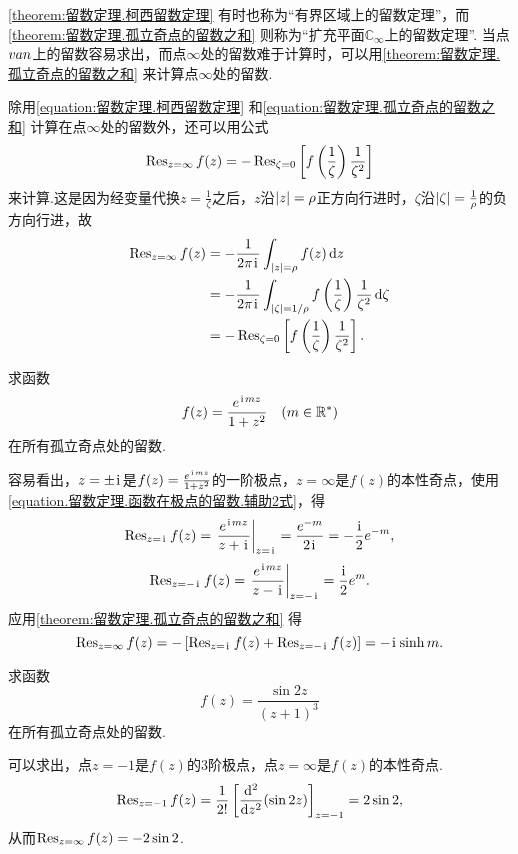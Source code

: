 \cref{theorem:留数定理.柯西留数定理} 有时也称为“有界区域上的留数定理”，而\cref{theorem:留数定理.孤立奇点的留数之和} 则称为“扩充平面\(\mathbb{C}_{\infty}\)上的留数定理”.
当点\(v{a}{n}\)上的留数容易求出，而点\(\infty\)处的留数难于计算时，可以用\cref{theorem:留数定理.孤立奇点的留数之和} 来计算点\(\infty\)处的留数.

除用\cref{equation:留数定理.柯西留数定理} 和\cref{equation:留数定理.孤立奇点的留数之和} 计算在点\(\infty\)处的留数外，还可以用公式\begin{equation}
\operatorname{Res}_{z=\infty} f(z)
= -\operatorname{Res}_{\zeta=0} \left[ f\left(\frac{1}{\zeta}\right) \frac{1}{\zeta^2} \right]
\end{equation}来计算.这是因为经变量代换\(z = \frac{1}{\zeta}\)之后，\(z\)沿\(\abs{z}=\rho\)正方向行进时，\(\zeta\)沿\(\abs{\zeta}=\frac{1}{\rho}\)的负方向行进，故\begin{align*}
\operatorname{Res}_{z=\infty} f(z)
&= -\frac{1}{2\pi\kern1pt\mathrm{i}\kern1pt} \int_{\abs{z}=\rho} f(z) \dd{z} \\
&= -\frac{1}{2\pi\kern1pt\mathrm{i}\kern1pt} \int_{\abs{\zeta}=1/\rho} f\left(\frac{1}{\zeta}\right) \frac{1}{\zeta^2} \dd{\zeta} \\
&= -\operatorname{Res}_{\zeta=0} \left[ f\left(\frac{1}{\zeta}\right) \frac{1}{\zeta^2} \right].
\end{align*}

\begin{example}
求函数\[
f(z) = \frac{e^{\kern1pt\mathrm{i}\kern1pt mz}}{1+z^2} \quad(m\in\mathbb{R}^*)
\]在所有孤立奇点处的留数.
\begin{solution}
容易看出，\(z=\pm\kern1pt\mathrm{i}\kern1pt\)是\(f(z) = \frac{e^{\kern1pt\mathrm{i}\kern1pt mz}}{1+z^2}\)的一阶极点，\(z=\infty\)是\(f(z)\)的本性奇点，使用\cref{equation.留数定理.函数在极点的留数.辅助2式}，得\[
\Res_{z=\iu} f(z)
= \eval{\frac{e^{\iu mz}}{z+\iu}}_{z=\iu}
= \frac{e^{-m}}{2\iu}
= -\frac{\iu}{2} e^{-m},
\]\[
\Res_{z=-\iu} f(z)
= \eval{\frac{e^{\iu mz}}{z-\iu}}_{z=-\iu}
= \frac{\iu}{2} e^m.
\]
应用\cref{theorem:留数定理.孤立奇点的留数之和} 得\[
\operatorname{Res}_{z=\infty} f(z)
= -\left[ \operatorname{Res}_{z=\kern1pt\mathrm{i}\kern1pt} f(z) + \operatorname{Res}_{z=-\kern1pt\mathrm{i}\kern1pt} f(z) \right]
= -\kern1pt\mathrm{i}\kern1pt \sinh m.
\]
\end{solution}
\end{example}

\begin{example}
求函数\[
f(z) = \frac{\sin 2z}{(z+1)^3}
\]在所有孤立奇点处的留数.
\begin{solution}
可以求出，点\(z=-1\)是\(f(z)\)的3阶极点，点\(z=\infty\)是\(f(z)\)的本性奇点.\[
\operatorname{Res}_{z=-1} f(z)
= \frac{1}{2!} \left[ \dv[2]{z}(\sin 2z) \right]_{z=-1}
= 2 \sin 2,
\]从而\(\operatorname{Res}_{z=\infty} f(z) = -2 \sin 2\).
\end{solution}
\end{example}


